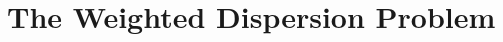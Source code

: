 \documentclass[11pt,a4paper]{article}
\theoremstyle{definition}
\theoremstyle{remark}
\begin{document}
%
%

\section{The Weighted Dispersion Problem}\label{section:weighted}

%
\end{document}
